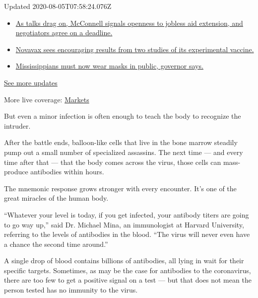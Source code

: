 Updated 2020-08-05T07:58:24.076Z

\begin{itemize}
\tightlist
\item
  \href{https://www.nytimes.com/2020/08/04/world/coronavirus-cases.html?action=click\&pgtype=Article\&state=default\&region=MAIN_CONTENT_1\&context=storylines_live_updates\#link-762df92}{As
  talks drag on, McConnell signals openness to jobless aid extension,
  and negotiators agree on a deadline.}
\item
  \href{https://www.nytimes.com/2020/08/04/world/coronavirus-cases.html?action=click\&pgtype=Article\&state=default\&region=MAIN_CONTENT_1\&context=storylines_live_updates\#link-1228a480}{Novavax
  sees encouraging results from two studies of its experimental
  vaccine.}
\item
  \href{https://www.nytimes.com/2020/08/04/world/coronavirus-cases.html?action=click\&pgtype=Article\&state=default\&region=MAIN_CONTENT_1\&context=storylines_live_updates\#link-794484ed}{Mississippians
  must now wear masks in public, governor says.}
\end{itemize}

\href{https://www.nytimes.com/2020/08/04/world/coronavirus-cases.html?action=click\&pgtype=Article\&state=default\&region=MAIN_CONTENT_1\&context=storylines_live_updates}{See
more updates}

More live coverage:
\href{https://www.nytimes.com/live/2020/08/04/business/stock-market-today-coronavirus?action=click\&pgtype=Article\&state=default\&region=MAIN_CONTENT_1\&context=storylines_live_updates}{Markets}

But even a minor infection is often enough to teach the body to
recognize the intruder.

After the battle ends, balloon-like cells that live in the bone marrow
steadily pump out a small number of specialized assassins. The next time
--- and every time after that --- that the body comes across the virus,
those cells can mass-produce antibodies within hours.

The mnemonic response grows stronger with every encounter. It's one of
the great miracles of the human body.

``Whatever your level is today, if you get infected, your antibody
titers are going to go way up,'' said Dr. Michael Mina, an immunologist
at Harvard University, referring to the levels of antibodies in the
blood. ``The virus will never even have a chance the second time
around.''

A single drop of blood contains billions of antibodies, all lying in
wait for their specific targets. Sometimes, as may be the case for
antibodies to the coronavirus, there are too few to get a positive
signal on a test --- but that does not mean the person tested has no
immunity to the virus.

